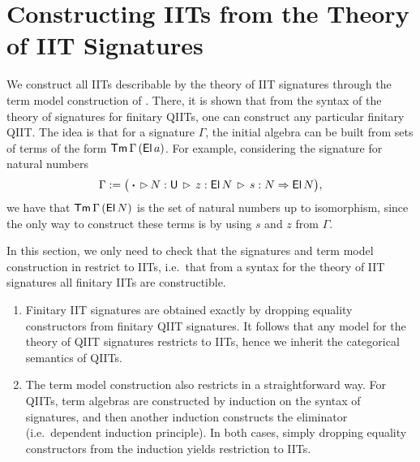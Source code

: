 \documentclass[a4paper,UKenglish,cleveref, autoref]{lipics-v2019}
\begin{document}




\section{Constructing IITs from the Theory of IIT Signatures}
\label{sec:constructingiits}

We construct all IITs describable by the theory of IIT signatures through the
term model construction of \cite{Kaposi:2019:CQI:3302515.3290315}. There, it is
shown that from the syntax of the theory of signatures for finitary QIITs, one
can construct any particular finitary QIIT. The idea is that for a signature
$\Gamma$, the initial algebra can be built from sets of terms of the form
$\mathsf{Tm}\,\Gamma\,(\mathsf{El}\,a)$. For example, considering the signature for natural
numbers
\[
  \Gamma := \big(\boldsymbol{\cdot}\,\rhd\,N:\mathsf{U}\,\rhd\,z : \mathsf{El}\,N\,\rhd\,s : N \Rightarrow \mathsf{El}\,N\big),
\]
we have that $\mathsf{Tm}\,\Gamma\,(\mathsf{El}\,N)$ is the set of natural numbers up to isomorphism,
since the only way to construct these terms is by using $s$ and $z$ from $\Gamma$.

In this section, we only need to check that the signatures and term model
construction in \cite{Kaposi:2019:CQI:3302515.3290315} restrict to IITs,
i.e.\ that from a syntax for the theory of IIT signatures all finitary IITs are
constructible.

\begin{enumerate}
\item
  Finitary IIT signatures are obtained exactly by dropping equality constructors from
  finitary QIIT signatures. It follows that any model for the theory of QIIT signatures
  restricts to IITs, hence we inherit the categorical semantics of QIITs.
\item
  The term model construction also restricts in a straightforward way. For QIITs,
  term algebras are constructed by induction on the syntax of signatures, and
  then another induction constructs the eliminator (i.e.\ dependent induction
  principle). In both cases, simply dropping equality constructors from the
  induction yields restriction to IITs.
\end{enumerate}
\end{document}

